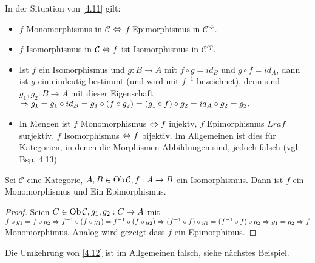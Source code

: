 \begin{anm}
	In der Situation von \ref{4.11} gilt:
	\begin{itemize}
		\item $f$ Monomorphismus in $\mathcal{C}$ $\Leftrightarrow$ $f$ Epimorphismus in $\mathcal{C}^{op}.$
		\item $f$ Isomorphismus in $\mathcal{C} \Leftrightarrow  f $ ist Isomorphismus in $\mathcal{C}^{op}.$
		\item Ist $f$ ein Isomorphismus und $g:B \to A $ mit $ f \circ g = id_B $ und $g \circ f = id_A$, dann ist $g$ ein eindeutig bestimmt (und wird mit $f^{-1} $ bezeichnet), denn sind $g_1,g_2: B \to A$ mit dieser Eigenschaft $\Rightarrow g_1 = g_1 \circ id_B = g_1 \circ (f \circ g_2) =(g_1 \circ f) \circ g_2 = id_A \circ g_2 = g_2.$
		\item In Mengen ist $f$ Monomorphismus $\Leftrightarrow f $ injektv, $f$ Epimorphismus $Lra f$ surjektiv, $f$ Isomorphismus $\Leftrightarrow f $ bijektiv. Im Allgemeinen ist dies für Kategorien, in denen die Morphismen Abbildungen sind, jedoch falsch (vgl. Bsp. 4.13)
	\end{itemize}
\end{anm}
\begin{bem}\label{4.12}
	Sei $\mathcal{C}$ eine Kategorie, $A,B \in \text{Ob}\,\mathcal{C}, f:A \to B $ ein Isomorphismus. Dann ist $f$ ein Monomorphismus und Ein Epimorphismus.
	\begin{proof}
		Seien $ C \in \text{Ob}\,\mathcal{C} , g_1,g_2:C \to A $ mit $ f \circ g_1 = f \circ g_2 \Rightarrow f^{-1} \circ (f \circ g_1) = f^{-1} \circ (f \circ g_2) \Rightarrow (f^{-1} \circ f) \circ g_1 = (f^{-1} \circ f) \circ g_2 \Rightarrow g_1=g_2 \Rightarrow f $ Monomorphimus. Analog wird gezeigt dass $f$ ein Epimorphimus. 
	\end{proof}
\end{bem}
\begin{anm}
	Die Umkehrung von \ref{4.12} ist im Allgemeinen falsch, siehe nächstes Beispiel.
\end{anm}
